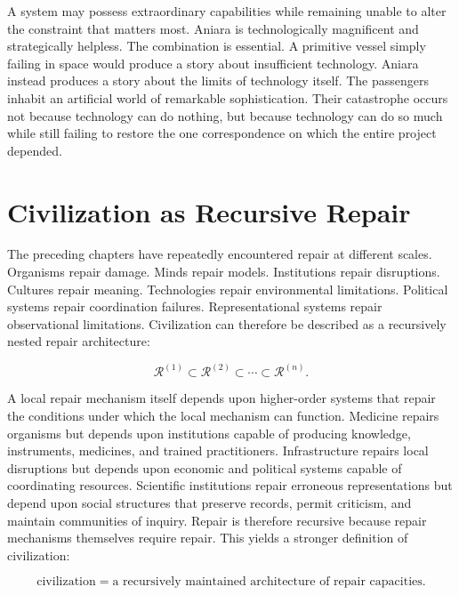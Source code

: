 \documentclass[11pt,oneside]{book}
\theoremstyle{definition}
\theoremstyle{remark}
\begin{document}
A system may possess extraordinary capabilities while remaining unable to alter the constraint that
matters most. Aniara is technologically magnificent and strategically helpless. The combination is
essential. A primitive vessel simply failing in space would produce a story about insufficient
technology. Aniara instead produces a story about the limits of technology itself. The passengers
inhabit an artificial world of remarkable sophistication. Their catastrophe occurs not because
technology can do nothing, but because technology can do so much while still failing to restore the
one correspondence on which the entire project depended.

\section{Civilization as Recursive Repair}

The preceding chapters have repeatedly encountered repair at different scales. Organisms repair
damage. Minds repair models. Institutions repair disruptions. Cultures repair meaning. Technologies
repair environmental limitations. Political systems repair coordination failures. Representational
systems repair observational limitations. Civilization can therefore be described as a recursively
nested repair architecture:

\[
\mathcal{R}^{(1)} \subset \mathcal{R}^{(2)} \subset \cdots \subset \mathcal{R}^{(n)}.
\]

A local repair mechanism itself depends upon higher-order systems that repair the conditions under
which the local mechanism can function. Medicine repairs organisms but depends upon institutions
capable of producing knowledge, instruments, medicines, and trained practitioners. Infrastructure
repairs local disruptions but depends upon economic and political systems capable of coordinating
resources. Scientific institutions repair erroneous representations but depend upon social
structures that preserve records, permit criticism, and maintain communities of inquiry. Repair is
therefore recursive because repair mechanisms themselves require repair. This yields a stronger
definition of civilization:

\[
\boxed{ \text{civilization} = \text{a recursively maintained architecture of repair capacities}. }
\]
\end{document}
